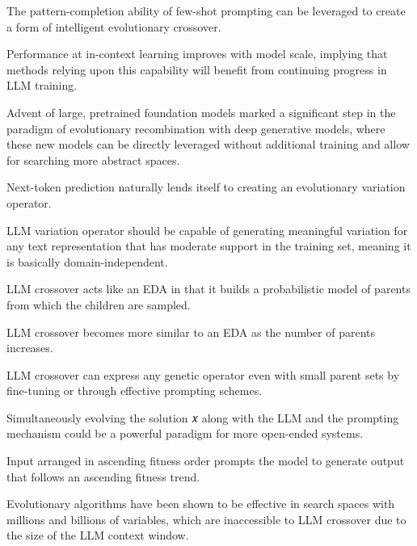 The pattern-completion ability of few-shot prompting can be leveraged to create a form of intelligent evolutionary crossover. \cite{meyerson2024languagemodelcrossovervariation}

Performance at in-context learning improves with model scale, implying that methods relying upon this capability will benefit from continuing progress in LLM training. \cite{meyerson2024languagemodelcrossovervariation}

Advent of large, pretrained foundation models marked a significant step in the paradigm of evolutionary recombination with deep generative models, where these new models can be directly leveraged without additional training and allow for searching more abstract spaces. \cite{meyerson2024languagemodelcrossovervariation}

Next-token prediction naturally lends itself to creating an evolutionary variation operator. \cite{meyerson2024languagemodelcrossovervariation}

LLM variation operator should be capable of generating meaningful variation for any text representation that has moderate support in the training set, meaning it is basically domain-independent. \cite{meyerson2024languagemodelcrossovervariation}

LLM crossover acts like an EDA in that it builds a probabilistic model of parents from which the children are sampled. \cite{meyerson2024languagemodelcrossovervariation}

LLM crossover becomes more similar to an EDA as the number of parents increases. \cite{meyerson2024languagemodelcrossovervariation}

LLM crossover can express any genetic operator even with small parent sets by fine-tuning or through effective prompting schemes. \cite{meyerson2024languagemodelcrossovervariation}

Simultaneously evolving the solution 𝑥 along with the LLM and the prompting mechanism could be a powerful paradigm for more open-ended systems. \cite{meyerson2024languagemodelcrossovervariation}

Input arranged in ascending fitness order prompts the model to generate output that follows an ascending fitness trend. \cite{meyerson2024languagemodelcrossovervariation}

Evolutionary algorithms have been shown to be effective in search spaces with millions and billions of variables, which are inaccessible to LLM crossover due to the size of the LLM context window. \cite{meyerson2024languagemodelcrossovervariation}

